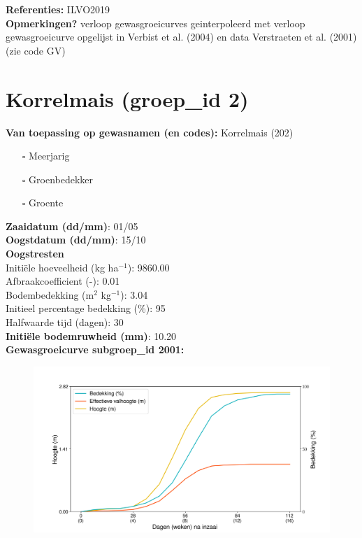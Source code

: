 \documentclass{article}
\begin{document}
  \textbf{Referenties:} ILVO2019 \vspace{0.10cm} \\ 
  \textbf{Opmerkingen?} verloop gewasgroeicurves geinterpoleerd met verloop gewasgroeicurve opgelijst in Verbist et al. (2004) en data Verstraeten et al. (2001) (zie code GV) \vspace{0.10cm} \\ 
 \newpage 
 \section{Korrelmais (groep\_id 2)} 
 \textbf{Van toepassing op gewasnamen (en codes):} Korrelmais (202) 
 \begin{multicols}{3} \begin{itemize} \item[$\square$] Meerjarig \item[$\square$] Groenbedekker \item[$\square$] Groente \end{itemize} \end{multicols} 
  \textbf{Zaaidatum (dd/mm)}: 01/05  \vspace{0.10cm} \\ 
  \textbf{Oogstdatum (dd/mm)}: 15/10  \vspace{0.10cm} \\ 
  \textbf{Oogstresten} \vspace{0.05cm} \\ 
  \tab Initi\"{e}le hoeveelheid (kg ha$^{-1}$): 9860.00 \vspace{0.05cm} \\ 
  \tab Afbraakcoefficient (-): 0.01 \vspace{0.05cm} \\ 
  \tab Bodembedekking (m$^2$ kg$^{-1}$): 3.04 \vspace{0.05cm} \\ 
  \tab Initieel percentage bedekking (\%): 95 \vspace{0.05cm} \\ 
  \tab Halfwaarde tijd (dagen): 30 \vspace{0.05cm} \\ 
  \textbf{Initi\"{e}le bodemruwheid (mm)}: 10.20 \vspace{0.05cm} \\ 
  \textbf{Gewasgroeicurve subgroep\_id 2001:} 
 \begin{center} \begin{figure}[H] \includegraphics[width=12.5cm]{temp/2001.png} \end{figure} \end{center} 
\end{document}
